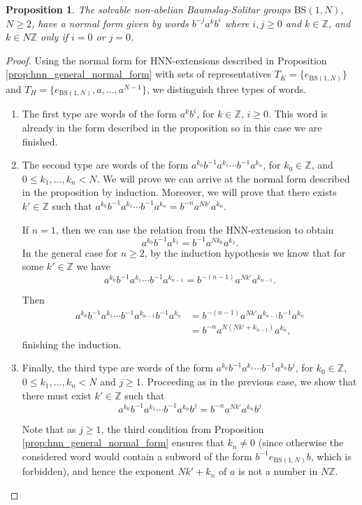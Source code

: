 \documentclass{aims}
\newcommand{\BS}[1][N]{\mathrm{BS}(1,#1)}
\newtheorem{proposition}{Proposition}
\theoremstyle{definition}
\begin{document}
\begin{proposition}\label{prop:normalform_bsgroups}
	The solvable non-abelian Baumslag-Solitar groups $\BS$, $N\ge 2$, have a normal form given by words $b^{-j}a^kb^{i}$ where $i,j\ge 0$ and $k\in \mathbb{Z}$, and $k\in N\mathbb{Z}$ only if $i=0$ or $j=0$.
\end{proposition}

\begin{proof}
	Using the normal form for HNN-extensions described in Proposition \ref{prop:hnn_general_normal_form} with sets of representatives $T_K=\{e_{\BS}\}$ and $T_H=\{e_{\BS},a,\ldots,a^{N-1}\}$, we distinguish three types of words.
	
	\begin{enumerate}[1.]
		\item The first type are words of the form $a^kb^i$, for $k\in\mathbb{Z} $, $i\ge 0$. This word is already in the form described in the proposition so in this case we are finished.
		\item The second type are words of the form $a^{k_0}b^{-1}a^{k_1}\cdots b^{-1}a^{k_n}$, for $k_0\in \mathbb{Z}$, and $0\le k_1,\ldots,k_n<N$. We will prove we can arrive at the normal form described in the proposition by induction. Moreover, we will prove that there exists $k'\in \mathbb{Z}$ such that $a^{k_0}b^{-1}a^{k_1}\cdots b^{-1}a^{k_n}=b^{-n}a^{Nk'}a^{k_n}$. 
		
		If $n=1$, then we can use the relation from the HNN-extension to obtain
		$$
		a^{k_0}b^{-1}a^{k_1}=b^{-1}a^{Nk_0}a^{k_1}.
		$$
		In the general case for $n\ge 2$, by the induction hypothesis we know that for some $k'\in \mathbb{Z}$ we have $$a^{k_0}b^{-1}a^{k_1}\cdots b^{-1}a^{k_{n-1}}=b^{-(n-1)}a^{Nk'}a^{k_{n-1}}.$$
		
		Then
		\begin{align*}
		a^{k_0}b^{-1}a^{k_1}\cdots b^{-1}a^{k_{n-1}}b^{-1}a^{k_n}&=b^{-(n-1)}a^{Nk'}a^{k_{n-1}}b^{-1}a^{k_n}\\
		&=b^{-n}a^{N(Nk'+k_{n-1})}a^{k_n},
		\end{align*}
		finishing the induction.
		\item Finally, the third type are words of the form $a^{k_0}b^{-1}a^{k_1}\cdots b^{-1}a^{k_n}b^{j}$, for $k_0\in \mathbb{Z}$, $0\le k_1,\ldots,k_n<N$ and $j\ge 1$. Proceeding as in the previous case, we show that there must exist $k'\in \mathbb{Z}$ such that
		$$
		a^{k_0}b^{-1}a^{k_1}\cdots b^{-1}a^{k_n}b^{j}=b^{-n}a^{Nk'}a^{k_n}b^{j}
		$$
		
		Note that as $j\ge 1$, the third condition from Proposition \ref{prop:hnn_general_normal_form} ensures that $k_n\neq 0$ (since otherwise the considered word would contain a subword of the form $b^{-1}e_{\BS}b$, which is forbidden), and hence the exponent $Nk'+k_n$ of $a$ is not a number in $N\mathbb{Z}$.
	\end{enumerate}
\end{proof}
\end{document}
